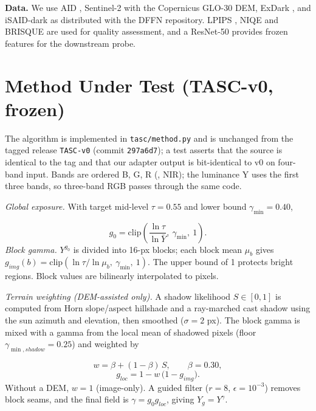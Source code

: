 \documentclass[conference]{IEEEtran}
\begin{document}
\textbf{Data.} We use AID \cite{xia2017aid}, Sentinel-2 \cite{drusch2012s2} with the Copernicus GLO-30 DEM, ExDark \cite{loh2019exdark}, and iSAID-dark as distributed with the DFFN repository. LPIPS \cite{zhang2018lpips}, NIQE \cite{mittal2013niqe} and BRISQUE \cite{mittal2012brisque} are used for quality assessment, and a ResNet-50 \cite{he2016resnet} provides frozen features for the downstream probe.

\section{Method Under Test (TASC-v0, frozen)}
The algorithm is implemented in \texttt{tasc/method.py} and is unchanged from the tagged release \texttt{TASC-v0} (commit \texttt{297a6d7}); a test asserts that the source is identical to the tag and that our adapter output is bit-identical to v0 on four-band input. Bands are ordered B, G, R (, NIR); the luminance Y uses the first three bands, so three-band RGB passes through the same code.

\emph{Global exposure.} With target mid-level $\tau = 0.55$ and lower bound $\gamma_{\min} = 0.40$,

\begin{equation}
g_0 = \mathrm{clip}\left(\frac{\ln \tau}{\ln \bar{Y}},\ \gamma_{\min},\ 1\right).
\end{equation}
\emph{Block gamma.} $Y^{g_0}$ is divided into 16-px blocks; each block mean $\mu_b$ gives $g_{img}(b) = \mathrm{clip}(\ln\tau / \ln\mu_b,\ \gamma_{\min},\ 1)$. The upper bound of 1 protects bright regions. Block values are bilinearly interpolated to pixels.

\emph{Terrain weighting (DEM-assisted only).} A shadow likelihood $S \in [0, 1]$ is computed from Horn slope/aspect hillshade and a ray-marched cast shadow using the sun azimuth and elevation, then smoothed ($\sigma = 2$ px). The block gamma is mixed with a gamma from the local mean of shadowed pixels (floor $\gamma_{\min,shadow} = 0.25$) and weighted by

\begin{equation}
w = \beta + (1-\beta)\,S,\qquad \beta = 0.30,
\end{equation}
\begin{equation}
g_{loc} = 1 - w\,\bigl(1 - g_{img}\bigr).
\end{equation}
Without a DEM, $w = 1$ (image-only). A guided filter \cite{he2013guided} ($r = 8$, $\epsilon = 10^{-3}$) removes block seams, and the final field is $\gamma = g_0 g_{loc}$, giving $Y_g = Y^{\gamma}$.
\end{document}
